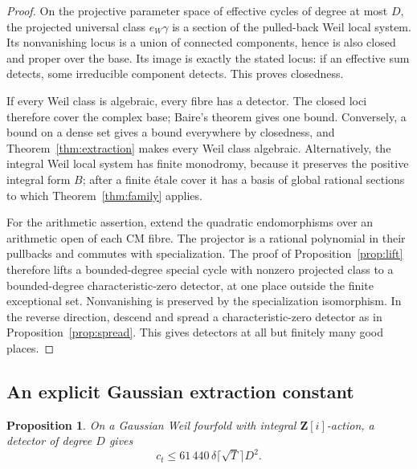 \documentclass[11pt]{article}
\newtheorem{proposition}[theorem]{Proposition}
\theoremstyle{definition}
\theoremstyle{remark}
\newcommand{\Z}{\mathbf Z}
\begin{document}
\begin{proof}
On the projective parameter space of effective cycles of degree at most $D$, the projected universal class $e_W\gamma$ is a section of the pulled-back Weil local system. Its nonvanishing locus is a union of connected components, hence is also closed and proper over the base. Its image is exactly the stated locus: if an effective sum detects, some irreducible component detects. This proves closedness.

If every Weil class is algebraic, every fibre has a detector. The closed loci therefore cover the complex base; Baire's theorem gives one bound. Conversely, a bound on a dense set gives a bound everywhere by closedness, and Theorem~\ref{thm:extraction} makes every Weil class algebraic. Alternatively, the integral Weil local system has finite monodromy, because it preserves the positive integral form $B$; after a finite \'etale cover it has a basis of global rational sections to which Theorem~\ref{thm:family} applies.

For the arithmetic assertion, extend the quadratic endomorphisms over an arithmetic open of each CM fibre. The projector is a rational polynomial in their pullbacks and commutes with specialization. The proof of Proposition~\ref{prop:lift} therefore lifts a bounded-degree special cycle with nonzero projected class to a bounded-degree characteristic-zero detector, at one place outside the finite exceptional set. Nonvanishing is preserved by the specialization isomorphism. In the reverse direction, descend and spread a characteristic-zero detector as in Proposition~\ref{prop:spread}. This gives detectors at all but finitely many good places.
\end{proof}

\subsection{An explicit Gaussian extraction constant}

\begin{proposition}\label{prop:gaussian-extraction}
On a Gaussian Weil fourfold with integral $\Z[i]$-action, a detector of degree $D$ gives
\[
 c_t\leq61\,440\,\delta\lceil\sqrt T\rceil D^2.
\]
\end{proposition}
\end{document}
